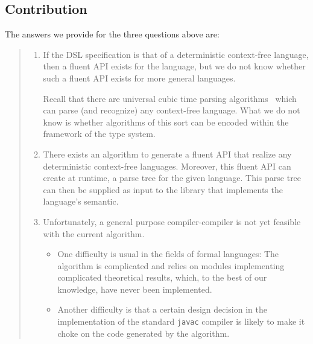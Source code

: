 \subsection{Contribution}
The answers we provide for the three questions above are:
\begin{quote}
  \begin{enumerate}
    \item If the DSL specification is that of a deterministic context-free
          language, then a fluent API exists for the language, but we do not know
          whether such a fluent API exists for more general languages.
          \par
          Recall that there are universal cubic time parsing
          algorithms~\cite{Cocke:1969,Earley:1970,Younger:1967} which can parse (and
          recognize) any context-free language. What we do not know is whether
          algorithms of this sort
          can be encoded within the framework of the \Java type system.
    \item
          There exists an algorithm to generate a fluent API that realize any
          deterministic context-free languages. Moreover, this fluent API can create
          at runtime, a parse tree for the given language. This parse tree can then be
          supplied as input to the library that implements the language's semantic.
    \item
          Unfortunately, a general purpose
          compiler-compiler is not yet feasible with the current algorithm.
          \begin{itemize}
            \item One difficulty is usual in the fields of formal languages:
                  The algorithm is complicated and relies on
                  modules implementing complicated theoretical results, which, to the best
                  of our knowledge, have never been implemented.
            \item Another difficulty is that a certain design decision in the
                  implementation of the standard \texttt{javac} compiler is likely to make
                  it choke on the \Java code generated by the algorithm.
          \end{itemize}
  \end{enumerate}
\end{quote}

